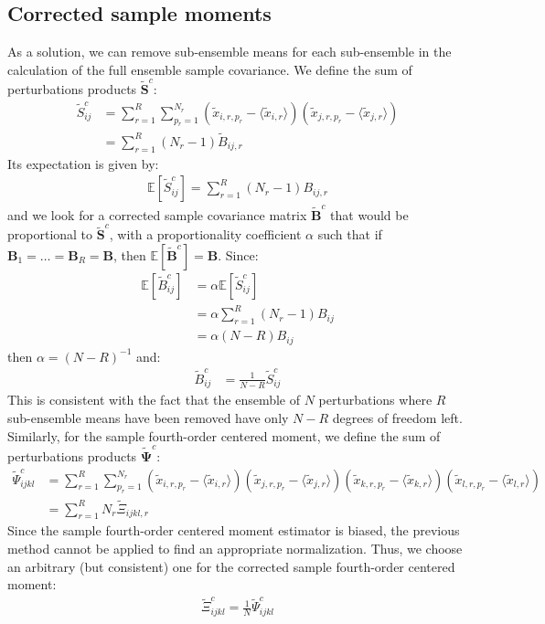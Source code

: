 \documentclass[12pt]{scrartcl}
\begin{document}
\subsection{Corrected sample moments}
As a solution, we can remove sub-ensemble means for each sub-ensemble in the calculation of the full ensemble sample covariance. We define the sum of perturbations products $\widetilde{\mathbf{S}}^c$:
\begin{align}
\widetilde{S}^c_{ij} & = \sum_{r=1}^R \sum_{p_r=1}^{N_r} \left(\widetilde{x}_{i,r,p_r} - \langle \widetilde{x}_{i,r} \rangle\right) \left(\widetilde{x}_{j,r,p_r} - \langle \widetilde{x}_{j,r} \rangle\right) \nonumber \\
& = \sum_{r=1}^R \left(N_r-1\right) \widetilde{B}_{ij,r}
\end{align}
Its expectation is given by:
\begin{align}
\mathbb{E} \left[\widetilde{S}^c_{ij}\right] = \sum_{r=1}^R \left(N_r-1\right) B_{ij,r}
\end{align}
and we look for a corrected sample covariance matrix $\widetilde{\mathbf{B}}^c$ that would be proportional to $\widetilde{\mathbf{S}}^c$, with a proportionality coefficient $\alpha$ such that if $\mathbf{B}_1 = \dots = \mathbf{B}_R = \mathbf{B}$, then $\mathbb{E} \left[\widetilde{\mathbf{B}}^c\right] = \mathbf{B}$. Since:
\begin{align}
\mathbb{E} \left[\widetilde{B}^c_{ij}\right] & = \alpha \mathbb{E} \left[\widetilde{S}^c_{ij}\right] \nonumber \\
& = \alpha \sum_{r=1}^R \left(N_r-1\right) B_{ij} \nonumber \\
& = \alpha (N-R) B_{ij}
\end{align}
then $\alpha = (N-R)^{-1}$ and:
\begin{align}
\widetilde{B}^c_{ij} & = \frac{1}{N-R} \widetilde{S}^c_{ij}
\end{align}
This is consistent with the fact that the ensemble of $N$ perturbations where $R$ sub-ensemble means have been removed have only $N-R$ degrees of freedom left.\\
$  $\\
Similarly, for the sample fourth-order centered moment, we define the sum of perturbations products $\widetilde{\boldsymbol{\Psi}}^c$:
\begin{align}
\widetilde{\Psi}^c_{ijkl} & = \sum_{r=1}^R \sum_{p_r=1}^{N_r} \left(\widetilde{x}_{i,r,p_r} - \langle \widetilde{x}_{i,r} \rangle\right) \left(\widetilde{x}_{j,r,p_r} - \langle \widetilde{x}_{j,r} \rangle\right) \left(\widetilde{x}_{k,r,p_r} - \langle \widetilde{x}_{k,r} \rangle\right) \left(\widetilde{x}_{l,r,p_r} - \langle \widetilde{x}_{l,r} \rangle\right) \nonumber \\
& = \sum_{r=1}^R N_r \widetilde{\Xi}_{ijkl,r}
\end{align}
Since the sample fourth-order centered moment estimator is biased, the previous method cannot be applied to find an appropriate normalization. Thus, we choose an arbitrary (but consistent) one for the corrected sample fourth-order centered moment:
\begin{align}
\widetilde{\Xi}^c_{ijkl} = \frac{1}{N} \widetilde{\Psi}^c_{ijkl} 
\end{align}
\end{document}
